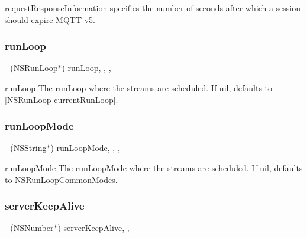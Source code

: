 request\+Response\+Information specifies the number of seconds after which a session should expire M\+Q\+TT v5. \mbox{\label{interface_m_q_t_t_session_a49e106f38faead00b6d9d53a77a50472}} 
\subsubsection{\texorpdfstring{run\+Loop}{runLoop}}
{\footnotesize\ttfamily -\/ (N\+S\+Run\+Loop$\ast$) run\+Loop\hspace{0.3cm}{\ttfamily [read]}, {\ttfamily [write]}, {\ttfamily [nonatomic]}, {\ttfamily [strong]}}

run\+Loop The run\+Loop where the streams are scheduled. If nil, defaults to \mbox{[}N\+S\+Run\+Loop current\+Run\+Loop\mbox{]}. \mbox{\label{interface_m_q_t_t_session_a3ab2f0926aa51b0dc7969c66bae215e4}} 
\subsubsection{\texorpdfstring{run\+Loop\+Mode}{runLoopMode}}
{\footnotesize\ttfamily -\/ (N\+S\+String$\ast$) run\+Loop\+Mode\hspace{0.3cm}{\ttfamily [read]}, {\ttfamily [write]}, {\ttfamily [nonatomic]}, {\ttfamily [strong]}}

run\+Loop\+Mode The run\+Loop\+Mode where the streams are scheduled. If nil, defaults to N\+S\+Run\+Loop\+Common\+Modes. \mbox{\label{interface_m_q_t_t_session_a423d97593b11b2aba0eabbc13ee29011}} 
\subsubsection{\texorpdfstring{server\+Keep\+Alive}{serverKeepAlive}}
{\footnotesize\ttfamily -\/ (N\+S\+Number$\ast$) server\+Keep\+Alive\hspace{0.3cm}{\ttfamily [read]}, {\ttfamily [nonatomic]}, {\ttfamily [strong]}}

